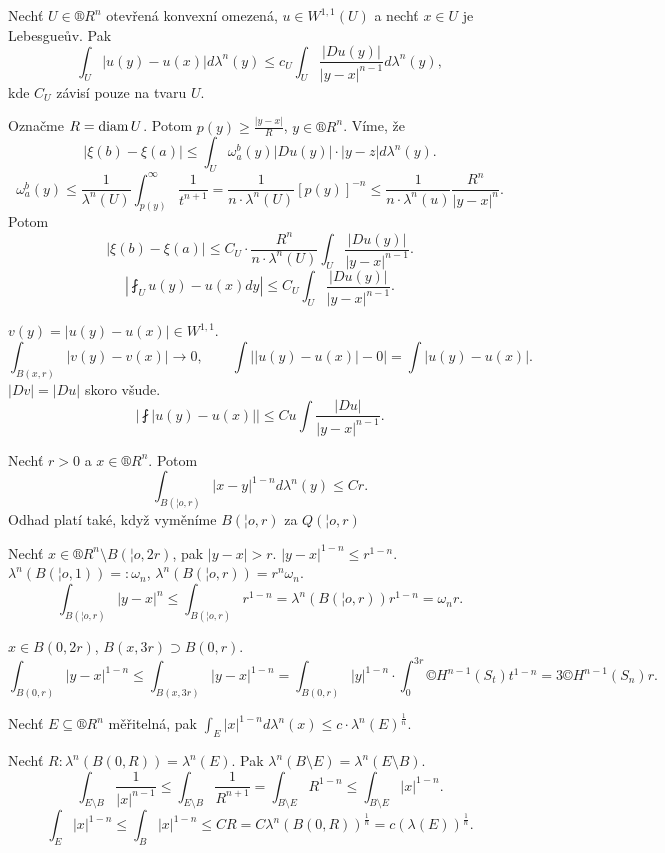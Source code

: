 \documentclass[12pt]{article}					%
\begin{document}
\begin{dusledek}
	Nechť $U \in ®R^n$ otevřená konvexní omezená, $u \in W^{1, 1}(U)$ a nechť $x \in U$ je Lebesgueův. Pak
	$$ \int_U |u(y) - u(x)| dλ^n(y) ≤ c_U \int_U \frac{|Du(y)|}{|y - x|^{n-1}} dλ^n(y), $$
	kde $C_U$ závisí pouze na tvaru $U$.

	\begin{dukazin}
		Označme $R = \operatorname{diam} U$. Potom $p(y) ≥ \frac{|y - x|}{R}$, $y \in ®R^n$. Víme, že 
		$$ |ξ(b) - ξ(a)| ≤ \int_U ω_a^b(y) |Du(y)|·|y - z| dλ^n(y). $$
		$$ ω_a^b(y) ≤ \frac{1}{λ^n(U)} \int_{p(y)}^∞ \frac{1}{t^{n+1}} = \frac{1}{n·λ^n(U)} [p(y)]^{-n} ≤ \frac{1}{n·λ^n(u)} \frac{R^n}{|y - x|^n}. $$
		Potom
		$$ |ξ(b) - ξ(a)| ≤ C_U · \frac{R^n}{n·λ^n(U)} \int_U \frac{|Du(y)|}{|y - x|^{n-1}}. $$
		$$ |\fint_U u(y) - u(x) dy| ≤ C_U \int_U \frac{|Du(y)|}{|y - x|^{n-1}}. $$

		$v(y) = |u(y) - u(x)| \in W^{1, 1}$.
		$$ \int_{B(x, r)} | v(y) - v(x) | \rightarrow 0, \qquad \int \left| |u(y) - u(x)| - 0\right| = \int |u(y) - u(x)|. $$
		$|Dv| = |Du|$ skoro všude.
		$$ \left| \fint |u(y) - u(x)| \right| ≤ Cu \int \frac{|Du|}{|y - x|^{n-1}}. $$
	\end{dukazin}
\end{dusledek}

\begin{lemma}
	Nechť $r > 0$ a $x \in ®R^n$. Potom
	$$ \int_{B(¦o, r)} |x - y|^{1 - n} dλ^n(y) ≤ Cr. $$
	Odhad platí také, když vyměníme $B(¦o, r)$ za $Q(¦o, r)$

	\begin{dukazin}
		Nechť $x \in ®R^n \setminus B(¦o, 2r)$, pak $|y - x| > r$. $|y - x|^{1 - n} ≤ r^{1 - n}$. $λ^n (B(¦o, 1)) =: ω_n$, $λ^n(B(¦o, r)) = r^n ω_n$.
		$$ \int_{B(¦o, r)} |y - x|^n ≤ \int_{B(¦o, r)} r^{1 - n} = λ^n(B(¦o, r)) r^{1 - n} = ω_n r. $$

		$x \in B(0, 2r)$, $B(x, 3r) \supset B(0, r)$.
		$$ \int_{B(0, r)} |y - x|^{1 - n} ≤ \int_{B(x, 3r)} |y - x|^{1 - n} = \int_{B(0, r)} |y|^{1 - n}·\int_0^{3r} ©H^{n - 1}(S_t) t^{1 - n} = 3 ©H^{n - 1} (S_n) r. $$
	\end{dukazin}
\end{lemma}

\begin{lemma}
	Nechť $E \subseteq ®R^n$ měřitelná, pak $\int_E |x|^{1 - n} dλ^n(x) ≤ c·λ^n(E)^{\frac{1}{n}}$.

	\begin{dukazin}
		Nechť $R: λ^n(B(0, R)) = λ^n(E)$. Pak $λ^n(B \setminus E) = λ^n(E \setminus B)$.
		$$ \int_{E \setminus B} \frac{1}{|x|^{n-1}} ≤ \int_{E \setminus B} \frac{1}{R^{n+1}} = \int_{B \setminus E} R^{1 - n} ≤ \int_{B \setminus E} |x|^{1 - n}. $$
		$$ \int_E |x|^{1 - n} ≤ \int_B |x|^{1 - n} ≤ C R = C λ^n(B(0, R))^{\frac{1}{n}} = c(λ(E))^{\frac{1}{n}}. $$
	\end{dukazin}
\end{lemma}
\end{document}
